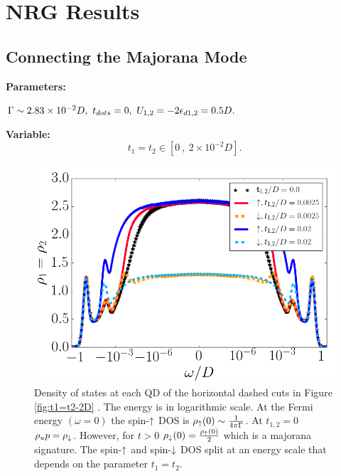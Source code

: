 \documentclass[showpacs,aps,prb,reprint,superscriptaddress]{revtex4-1}
\begin{document}
\section{NRG Results}
\label{sec:Results}


\subsection{Connecting the Majorana Mode \label{sub:t1=t2}}

\textbf{Parameters:}

    $\Gamma \sim 2.83\times10^{-2}D,\  t_{dots}=0 ,\  U_{1,2} = -2\epsilon_{d1,2} = 0.5D.$

\textbf{Variable:}
    $$t_1=t_2 \in [0\  ,\  2\times10^{-2}D].$$
    \begin{figure}[bt]
    \centering
    \includegraphics[scale=0.35]{Graficos/LogPlot.png}
    \caption{\label{fig:t1=t2/logplot} Density of states at each QD of the horizontal dashed cuts in Figure \ref{fig:t1=t2-2D} . The energy is in logarithmic scale. At the Fermi energy $(\omega =0)$ the spin-$\uparrow$ DOS is $\rho_\uparrow(0) \sim \frac{1}{4\pi\Gamma}$. At $t_{1,2}=0$ $\rho_up=\rho_\downarrow$. However, for  $t>0$  $\rho_\downarrow(0) = \frac{\rho_\uparrow(0)}{2}$ which is a majorana signature. The spin-$\uparrow$ and spin-$\downarrow$ DOS split at an energy scale that depends on the parameter $t_{1}=t_2$.}
    \end{figure}
\end{document}
